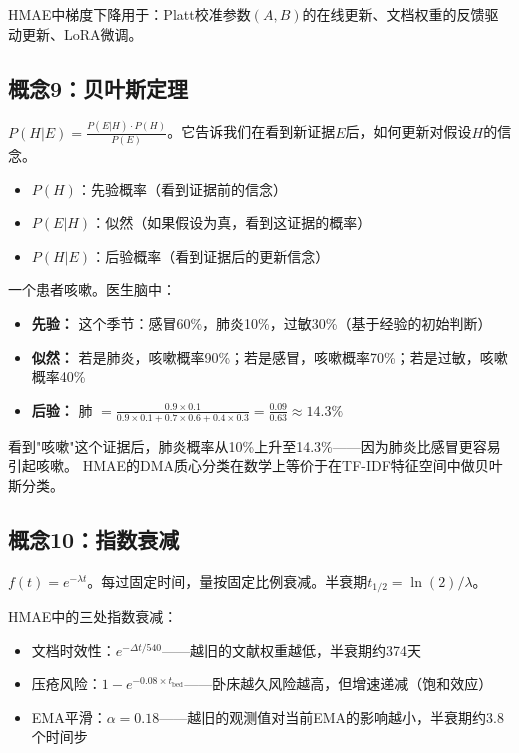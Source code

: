 \documentclass[11pt,a4paper]{ctexart}
\begin{document}
HMAE中梯度下降用于：Platt校准参数$(A,B)$的在线更新、文档权重的反馈驱动更新、LoRA微调。

\subsection{概念9：贝叶斯定理}

\begin{defbox}
$P(H|E) = \frac{P(E|H) \cdot P(H)}{P(E)}$。它告诉我们在看到新证据$E$后，如何更新对假设$H$的信念。
\begin{itemize}[nosep]
\item $P(H)$：先验概率（看到证据前的信念）
\item $P(E|H)$：似然（如果假设为真，看到这证据的概率）
\item $P(H|E)$：后验概率（看到证据后的更新信念）
\end{itemize}
\end{defbox}

\begin{exambox}[医生看病中的贝叶斯推理]
一个患者咳嗽。医生脑中：
\begin{itemize}[nosep]
\item \textbf{先验：} 这个季节：感冒60\%，肺炎10\%，过敏30\%（基于经验的初始判断）
\item \textbf{似然：} 若是肺炎，咳嗽概率90\%；若是感冒，咳嗽概率70\%；若是过敏，咳嗽概率40\%
\item \textbf{后验：} 肺 $= \frac{0.9 \times 0.1}{0.9\times0.1 + 0.7\times0.6 + 0.4\times0.3} = \frac{0.09}{0.63} \approx 14.3\%$
\end{itemize}
看到"咳嗽"这个证据后，肺炎概率从10\%上升至14.3\%——因为肺炎比感冒更容易引起咳嗽。
HMAE的DMA质心分类在数学上等价于在TF-IDF特征空间中做贝叶斯分类。
\end{exambox}

\subsection{概念10：指数衰减}

\begin{defbox}
$f(t) = e^{-\lambda t}$。每过固定时间，量按固定比例衰减。半衰期$t_{1/2} = \ln(2)/\lambda$。
\end{defbox}

HMAE中的三处指数衰减：
\begin{itemize}[nosep]
\item 文档时效性：$e^{-\Delta t / 540}$——越旧的文献权重越低，半衰期约374天
\item 压疮风险：$1-e^{-0.08 \times t_{\text{bed}}}$——卧床越久风险越高，但增速递减（饱和效应）
\item EMA平滑：$\alpha=0.18$——越旧的观测值对当前EMA的影响越小，半衰期约3.8个时间步
\end{itemize}
\end{document}
